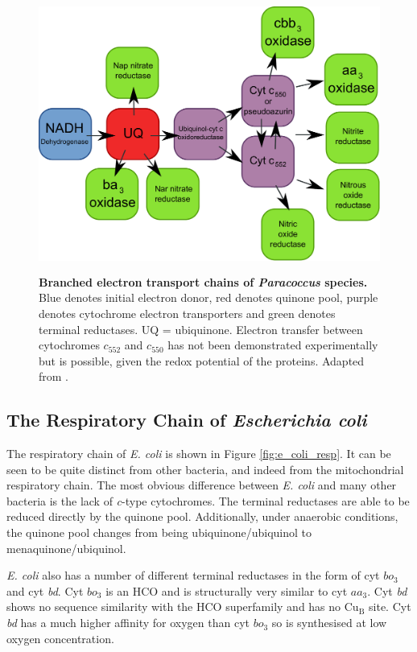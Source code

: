 \begin{figure}[tbp]
\begin{center}
	\includegraphics[height=9cm]{01-introduction/data/paracoccus_resp.pdf}
	\caption[{Branched electron transport chains of \textit{Paracoccus} species.}]{{\bf Branched electron transport chains of \textit{Paracoccus} species.} Blue denotes initial electron donor, red denotes quinone pool, purple denotes cytochrome electron transporters and green denotes terminal reductases. UQ = ubiquinone. Electron transfer between cytochromes $c_{552}$ and $c_{550}$ has not been demonstrated experimentally but is possible, given the redox potential of the proteins. Adapted from \citet{Baker1998}.
	\label{fig:paracoccus_resp}}
\end{center}
\end{figure}

\subsection{The Respiratory Chain of \textit{Escherichia coli}}
The respiratory chain of \textit{E. coli} is shown in Figure \ref{fig:e_coli_resp}. It can be seen to be quite distinct from other bacteria, and indeed from the mitochondrial respiratory chain. The most obvious difference between \textit{E. coli} and many other bacteria is the lack of \textit{c}-type cytochromes. The terminal reductases are able to be reduced directly by the quinone pool. Additionally, under anaerobic conditions, the quinone pool changes from being ubiquinone/ubiquinol to menaquinone/ubiquinol.

\textit{E. coli} also has a number of different terminal reductases in the form of cyt $bo_3$ and cyt \textit{bd}. Cyt $bo_3$ is an HCO and is structurally very similar to cyt $aa_3$. Cyt \textit{bd} shows no sequence similarity with the HCO superfamily and has no $\mathrm{Cu}_\mathrm{B}$ site. Cyt \textit{bd} has a much higher affinity for oxygen than cyt $bo_3$ so is synthesised at low oxygen concentration.

